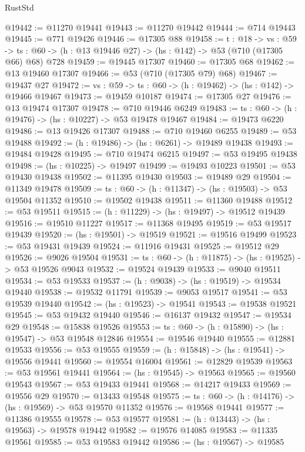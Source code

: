 \begin{lexlean}{RustStd}
\begin{coremodule}
@19442 := @11270 @19441
@19443 := @11270 @19442
@19444 := @714 @19443
@19445 := @771 @19426
@19446 := @17305 @88
@19458 := {t : @18} ->
  {vs : @59} ->
  {ts : @60} -> (h : @13 @19446 @27) -> (hs : @142) -> @53 (@710 (@17305 @66) @68) @728
@19459 := @19445 @17307
@19460 := @17305 @68
@19462 := @13 @19460 @17307
@19466 := @53 (@710 (@17305 @79) @68)
@19467 := @19437 @27
@19472 := {vs : @59} -> {ts : @60} -> (h : @19462) -> (hs : @142) -> @19466 @19467
@19473 := @19459 @10187
@19474 := @17305 @27
@19476 := @13 @19474 @17307
@19478 := @710 @19446 @6249
@19483 := {ts : @60} -> (h : @19476) -> (hs : @10227) -> @53 @19478 @19467
@19484 := @19473 @6220
@19486 := @13 @19426 @17307
@19488 := @710 @19460 @6255
@19489 := @53 @19488
@19492 := (h : @19486) -> (hs : @6261) -> @19489 @19438
@19493 := @19484 @19428
@19495 := @710 @19474 @6215
@19497 := @53 @19495 @19438
@19498 := (hs : @10225) -> @19497
@19499 := @19493 @10223
@19501 := @53 @19430 @19438
@19502 := @11395 @19430
@19503 := @19489 @29
@19504 := @11349 @19478
@19509 := {ts : @60} -> (h : @11347) -> (hs : @19503) -> @53 @19504 @11352
@19510 := @19502 @19438
@19511 := @11360 @19488
@19512 := @53 @19511
@19515 := (h : @11229) -> (hs : @19497) -> @19512 @19439
@19516 := @19510 @11227
@19517 := @11368 @19495
@19519 := @53 @19517 @19439
@19520 := (hs : @19501) -> @19519
@19521 := @19516 @19499
@19523 := @53 @19431 @19439
@19524 := @11916 @19431
@19525 := @19512 @29
@19526 := @9026 @19504
@19531 := {ts : @60} -> (h : @11875) -> (hs : @19525) -> @53 @19526 @9043
@19532 := @19524 @19439
@19533 := @9040 @19511
@19534 := @53 @19533
@19537 := (h : @9038) -> (hs : @19519) -> @19534 @19440
@19538 := @19532 @11791
@19539 := @9053 @19517
@19541 := @53 @19539 @19440
@19542 := (hs : @19523) -> @19541
@19543 := @19538 @19521
@19545 := @53 @19432 @19440
@19546 := @16137 @19432
@19547 := @19534 @29
@19548 := @15838 @19526
@19553 := {ts : @60} -> (h : @15890) -> (hs : @19547) -> @53 @19548 @12846
@19554 := @19546 @19440
@19555 := @12881 @19533
@19556 := @53 @19555
@19559 := (h : @15848) -> (hs : @19541) -> @19556 @19441
@19560 := @19554 @16004
@19561 := @12829 @19539
@19563 := @53 @19561 @19441
@19564 := (hs : @19545) -> @19563
@19565 := @19560 @19543
@19567 := @53 @19433 @19441
@19568 := @14217 @19433
@19569 := @19556 @29
@19570 := @13433 @19548
@19575 := {ts : @60} -> (h : @14176) -> (hs : @19569) -> @53 @19570 @11352
@19576 := @19568 @19441
@19577 := @11386 @19555
@19578 := @53 @19577
@19581 := (h : @13443) -> (hs : @19563) -> @19578 @19442
@19582 := @19576 @14085
@19583 := @11335 @19561
@19585 := @53 @19583 @19442
@19586 := (hs : @19567) -> @19585

\end{coremodule}
\end{lexlean}

